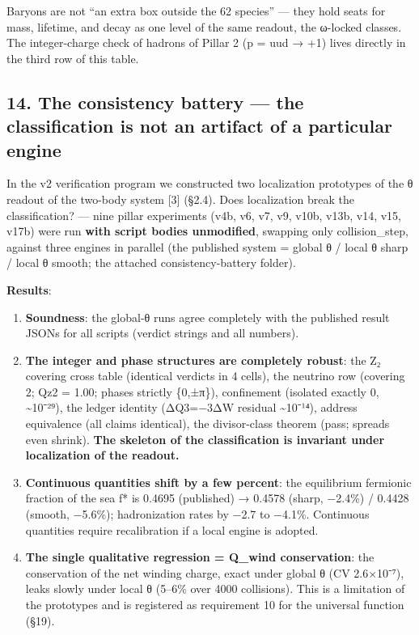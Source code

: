 \documentclass[
]{article}
\providecommand{\tightlist}{%
  \setlength{\itemsep}{0pt}\setlength{\parskip}{0pt}}
\begin{document}
Baryons are not ``an extra box outside the 62 species'' --- they hold
seats for mass, lifetime, and decay as one level of the same readout,
the ω-locked classes. The integer-charge check of hadrons of Pillar 2 (p
= uud → +1) lives directly in the third row of this table.

\subsection{14. The consistency battery --- the classification is not an
artifact of a particular
engine}\label{the-consistency-battery-the-classification-is-not-an-artifact-of-a-particular-engine}

In the v2 verification program we constructed two localization
prototypes of the θ readout of the two-body system {[}3{]} (§2.4). Does
localization break the classification? --- nine pillar experiments (v4b,
v6, v7, v9, v10b, v13b, v14, v15, v17b) were run \textbf{with script
bodies unmodified}, swapping only collision\_step, against three engines
in parallel (the published system = global θ / local θ sharp / local θ
smooth; the attached consistency-battery folder).

\textbf{Results}:

\begin{enumerate}
\def\labelenumi{\arabic{enumi}.}
\tightlist
\item
  \textbf{Soundness}: the global-θ runs agree completely with the
  published result JSONs for all scripts (verdict strings and all
  numbers).
\item
  \textbf{The integer and phase structures are completely robust}: the
  Z₂ covering cross table (identical verdicts in 4 cells), the neutrino
  row (covering 2; Qz2 = 1.00; phases strictly \{0,±π\}), confinement
  (isolated exactly 0, \textasciitilde10⁻²⁹), the ledger identity
  (ΔQ3=−3ΔW residual \textasciitilde10⁻¹⁴), address equivalence (all
  claims identical), the divisor-class theorem (pass; spreads even
  shrink). \textbf{The skeleton of the classification is invariant under
  localization of the readout.}
\item
  \textbf{Continuous quantities shift by a few percent}: the equilibrium
  fermionic fraction of the sea f* is 0.4695 (published) → 0.4578
  (sharp, −2.4\%) / 0.4428 (smooth, −5.6\%); hadronization rates by −2.7
  to −4.1\%. Continuous quantities require recalibration if a local
  engine is adopted.
\item
  \textbf{The single qualitative regression = Q\_wind conservation}: the
  conservation of the net winding charge, exact under global θ (CV
  2.6×10⁻⁷), leaks slowly under local θ (5--6\% over 4000 collisions).
  This is a limitation of the prototypes and is registered as
  requirement 10 for the universal function (§19).
\end{enumerate}
\end{document}
